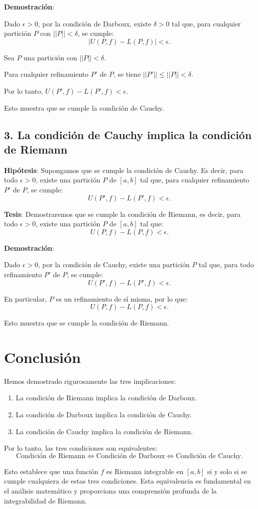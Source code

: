 \documentclass{article}
\begin{document}
\textbf{Demostración}:

Dado $\epsilon > 0$, por la condición de Darboux, existe $\delta > 0$ tal que, para cualquier partición $P$ con $||P|| < \delta$, se cumple:
\[
|U(P, f) - L(P, f)| < \epsilon.
\]

Sea $P$ una partición con $||P|| < \delta$.

Para cualquier refinamiento $P'$ de $P$, se tiene $||P'|| \leq ||P|| < \delta$.

Por lo tanto, $U(P', f) - L(P', f) < \epsilon$.

Esto muestra que se cumple la condición de Cauchy.

\subsection*{3. La condición de Cauchy implica la condición de Riemann}

\textbf{Hipótesis}: Supongamos que se cumple la condición de Cauchy. Es decir, para todo $\epsilon > 0$, existe una partición $P$ de $[a, b]$ tal que, para cualquier refinamiento $P'$ de $P$, se cumple:
\[
U(P', f) - L(P', f) < \epsilon.
\]

\textbf{Tesis}: Demostraremos que se cumple la condición de Riemann, es decir, para todo $\epsilon > 0$, existe una partición $P$ de $[a, b]$ tal que:
\[
U(P, f) - L(P, f) < \epsilon.
\]

\textbf{Demostración}:

Dado $\epsilon > 0$, por la condición de Cauchy, existe una partición $P$ tal que, para todo refinamiento $P'$ de $P$, se cumple:
\[
U(P', f) - L(P', f) < \epsilon.
\]

En particular, $P$ es un refinamiento de sí misma, por lo que:
\[
U(P, f) - L(P, f) < \epsilon.
\]

Esto muestra que se cumple la condición de Riemann.

\section*{Conclusión}
Hemos demostrado rigurosamente las tres implicaciones:

\begin{enumerate}
    \item La condición de Riemann implica la condición de Darboux.
    \item La condición de Darboux implica la condición de Cauchy.
    \item La condición de Cauchy implica la condición de Riemann.
\end{enumerate}

Por lo tanto, las tres condiciones son equivalentes:
\[
\text{Condición de Riemann} \iff \text{Condición de Darboux} \iff \text{Condición de Cauchy}.
\]

Esto establece que una función $f$ es Riemann integrable en $[a, b]$ si y solo si se cumple cualquiera de estas tres condiciones. Esta equivalencia es fundamental en el análisis matemático y proporciona una comprensión profunda de la integrabilidad de Riemann.
\end{document}
